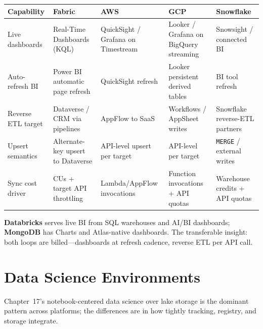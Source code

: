 \begin{center}
\footnotesize
\begin{tabular}{@{}p{2.8cm}p{3.2cm}p{3.2cm}p{3.2cm}p{3.2cm}@{}}
\toprule
\textbf{Capability} & \textbf{Fabric} & \textbf{AWS} & \textbf{GCP} & \textbf{Snowflake} \\
\midrule
Live dashboards & Real-Time Dashboards (KQL) & QuickSight / Grafana on Timestream & Looker / Grafana on BigQuery streaming & Snowsight / connected BI \\
Auto-refresh BI & Power BI automatic page refresh & QuickSight refresh & Looker persistent derived tables & BI tool refresh \\
Reverse ETL target & Dataverse / CRM via pipelines & AppFlow to SaaS & Workflows / AppSheet writes & Snowflake reverse-ETL partners \\
Upsert semantics & Alternate-key upsert to Dataverse & API-level upsert per target & API-level per target & \texttt{MERGE} / external writes \\
Sync cost driver & CUs + target API throttling & Lambda/AppFlow invocations & Function invocations + API quotas & Warehouse credits + API quotas \\
\bottomrule
\end{tabular}
\end{center}

\noindent \textbf{Databricks} serves live BI from SQL warehouses and AI/BI dashboards;
\textbf{MongoDB} has Charts and Atlas-native dashboards. The transferable insight: both loops
are billed---dashboards at refresh cadence, reverse ETL per API call.

\section{Data Science Environments}
%
Chapter~17's notebook-centered data science over lake storage is the dominant pattern across
platforms; the differences are in how tightly tracking, registry, and storage integrate.

